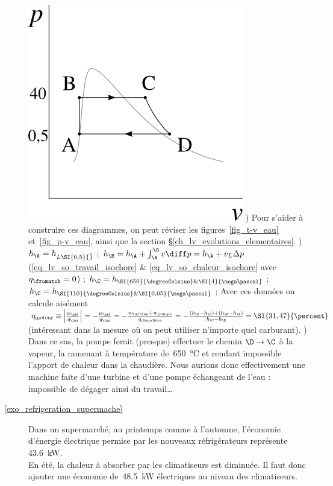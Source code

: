 \begin{description}
			\includegraphics[height=\solutiondiagramwidth]{images/exo_sol_pv_moteur_vapeur.png}
			) Pour s’aider à construire ces diagrammes, on peut réviser les figures~\ref{fig_t-v_eau} et~\ref{fig_p-v_eau}, ainsi que la section \S\ref{ch_lv_evolutions_elementaires}.
			)	$h_\A = h_{L \SI{0,5}{\bar}}$ ;
						$h_\B = h_\A + \int_\A^\B v \diff p = h_\A + v_L \Delta p $ (\ref{eq_lv_so_travail_isochore} \& \ref{eq_lv_so_chaleur_isochore} avec $q_\fromatob = 0$) ;
						$h_\C = h_{\SI{650}{\degreeCelsius} \& \SI{4}{\mega\pascal}}$ ;
						$h_\C = h_{\SI{110}{\degreeCelsius} \& \SI{0,05}{\mega\pascal}}$ ;
						Avec ces données on calcule aisément $\eta_\text{moteur} \equiv \left|\frac{w_\net}{q_\inn}\right| = -\frac{w_\net}{q_\inn} = -\frac{w_\text{turbine} + w_\text{pompe}}{q_\text{chaudière}} = -\frac{(h_\D - h_\C) + (h_\B - h_\A)}{h_\C - h_\B} = \SI{31,47}{\percent}$ (intéressant dans la mesure où on peut utiliser n’importe quel carburant).
			\tab{}) Dans ce cas, la pompe ferait (presque) effectuer le chemin $\D \to \C$ à la vapeur, la ramenant à température de~\SI{650}{\degreeCelsius} et rendant impossible l’apport de chaleur dans la chaudière. Nous aurions donc effectivement une machine faite d’une turbine et d’une pompe échangeant de l’eau : impossible de dégager ainsi du travail…
	\item [\ref{exo_refrigeration_supermache}]
			\tab Dans un supermarché, au printemps comme à l’automne, l’économie d’énergie électrique permise par les nouveaux réfrigérateurs représente \SI{43,6}{\kilo\watt}.\\
			En été, la chaleur à absorber par les climatiseurs est diminuée. Il faut donc ajouter une économie de~\SI{48,5}{\kilo\watt} électriques au niveau des climatiseurs.\\

\end{description}
